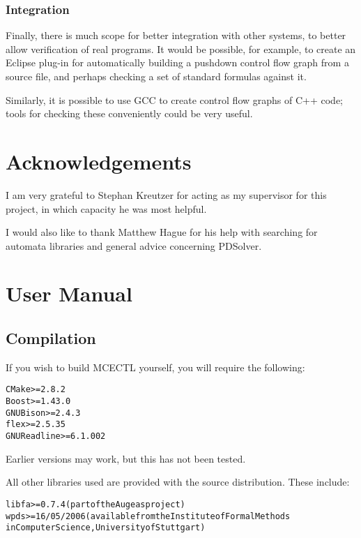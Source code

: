 \documentclass[11pt]{article}
\theoremstyle{definition}
\begin{document}
\subsubsection{Integration}

Finally, there is much scope for better integration with other systems, to
better allow verification of real programs. It would be possible, for example,
to create an Eclipse plug-in for automatically building a pushdown control flow
graph from a source file, and perhaps checking a set of standard formulas
against it.

Similarly, it is possible to use GCC to create control flow graphs of C++ code;
tools for checking these conveniently could be very useful.

\section{Acknowledgements}

I am very grateful to Stephan Kreutzer for acting as my supervisor for this
project, in which capacity he was most helpful.

I would also like to thank Matthew Hague for his help with searching for
automata libraries and general advice concerning PDSolver.

{}

%

\appendix
\section{User Manual}

\subsection{Compilation}

If you wish to build MCECTL yourself, you will require the following:
\begin{alltt}
CMake >= 2.8.2
Boost >= 1.43.0
GNU Bison >= 2.4.3
flex >= 2.5.35
GNU Readline >= 6.1.002
\end{alltt}

Earlier versions may work, but this has not been tested.

All other libraries used are provided with the source distribution. These include:
\begin{alltt}
libfa >= 0.7.4 (part of the Augeas project)
wpds >= 16/05/2006 (available from the Institute of Formal Methods 
in Computer Science, University of Stuttgart)
\end{alltt}
\end{document}
